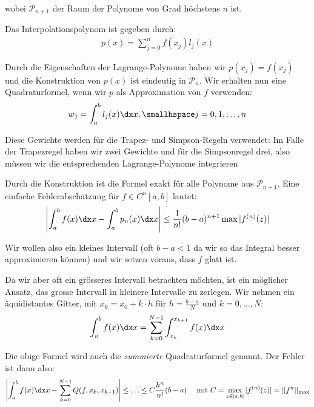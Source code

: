 \vspace{-1.5pc}
wobei $\mathcal{P}_{n + 1}$ der Raum der Polynome von Grad höchstens $n$ ist.

Das Interpolationspolynom ist gegeben durch:
\drmvspace
\begin{align*}
    p(x) = \sum_{j = 0}^{n} f(x_j) l_j(x)
\end{align*}

\drmvspace
Durch die Eigenschaften der Lagrange-Polynome haben wir $p(x_j) = f(x_j)$ und die Konstruktion von $p(x)$ ist eindeutig in $\mathcal{P}_{n}$.
Wir erhalten nun eine Quadraturformel, wenn wir $p$ als Approximation von $f$ verwenden:
\rmvspace
\begin{align*}
    w_j = \int_{a}^{b} l_j(x) \dx x, \smallhspace j = 0, 1, \ldots, n
\end{align*}
\drmvspace

Diese Gewichte werden für die Trapez- und Simpson-Regeln verwendet: Im Falle der Trapezregel haben wir zwei Gewichte und für die Simpsonregel drei,
also müssen wir die entsprechenden Lagrange-Polynome integrieren

Durch die Konstruktion ist die Formel exakt für alle Polynome aus $\mathcal{P}_{n + 1}$. Eine einfache Fehlerabschätzung für $f\in C^{n}[a,b]$ lautet:
\rmvspace
\begin{align*}
\left| \int_{a}^{b} f(x) \dx x - \int_{a}^{b} p_n(x) \dx x \right| \leq \frac{1}{n!}(b - a)^{n + 1} \max|f^{(n)}(z)|
\end{align*}

\drmvspace
Wir wollen also ein kleines Intervall (oft $b - a < 1$ da wir so das Integral besser approximieren können) und wir setzen voraus, dass $f$ glatt ist.

Da wir aber oft ein grösseres Intervall betrachten möchten, ist ein möglicher Ansatz, das grosse Intervall in kleinere Intervalle zu zerlegen.
Wir nehmen ein äquidistantes Gitter, mit $x_k = x_0 + k \cdot h$ für $h = \frac{b - a}{N}$ und $k = 0, \ldots, N$:
\rmvspace
\begin{align*}
    \int_{a}^{b} f(x) \dx x = \sum_{k = 0}^{N - 1} \int_{x_k}^{x_{k + 1}} f(x) \dx x
\end{align*}

\rmvspace
Die obige Formel wird auch die \textit{summierte} Quadraturformel genannt. Der Fehler ist dann also:
\rmvspace
\begin{align*}
    \left| \int_{a}^{b} f(x) \dx x - \sum_{k = 0}^{N - 1} Q(f, x_k, x_{k + 1}) \right| \leq \ldots \leq C \frac{h^n}{n!}(b - a) &  &
    \text{ mit } C = \max_{z \in [a, b]} |f^{(n)}(z)| = ||f^n||_{\max}
\end{align*}

